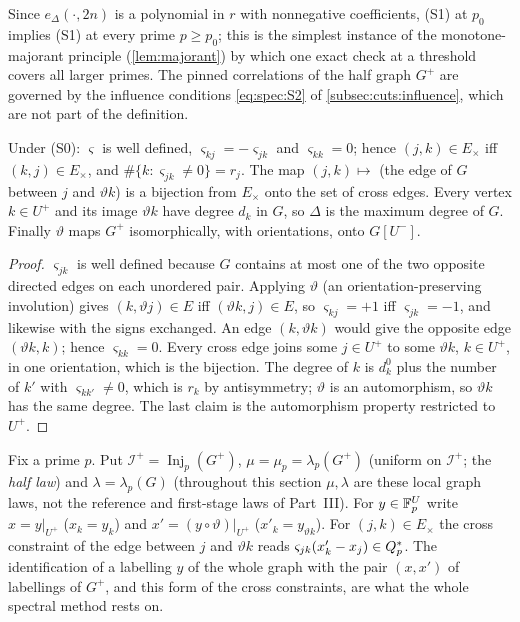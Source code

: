 Since $e_\Delta(\cdot,2n)$ is a polynomial in $r$ with nonnegative
coefficients, (S1) at $p_0$ implies (S1) at every prime $p\ge p_0$; this is the
simplest instance of the monotone-majorant principle (\cref{lem:majorant}) by
which one exact check at a threshold covers all larger primes. The pinned
correlations of the half graph $G^+$ are governed by the influence conditions
\eqref{eq:spec:S2} of \cref{subsec:cuts:influence}, which are not part of the
definition.

\begin{lemma}\label{lem:spec:elementary}
Under \textup{(S0)}: $\varsigma$ is well defined, $\varsigma_{kj}=-\varsigma_{jk}$
and $\varsigma_{kk}=0$; hence $(j,k)\in E_\times$ iff $(k,j)\in E_\times$, and
$\#\{k:\varsigma_{jk}\ne0\}=r_j$. The map $(j,k)\mapsto$ (the edge of $G$
between $j$ and $\vartheta k$) is a bijection from $E_\times$ onto the set of
cross edges. Every vertex $k\in U^+$ and its image $\vartheta k$ have degree
$d_k$ in $G$, so $\Delta$ is the maximum degree of $G$. Finally $\vartheta$
maps $G^+$ isomorphically, with orientations, onto $G[U^-]$.
\end{lemma}

\begin{proof}
$\varsigma_{jk}$ is well defined because $G$ contains at most one
of the two opposite directed edges on each unordered pair.
Applying
$\vartheta$ (an orientation-preserving involution) gives $(k,\vartheta j)\in E$
iff $(\vartheta k,j)\in E$, so $\varsigma_{kj}=+1$ iff $\varsigma_{jk}=-1$, and
likewise with the signs exchanged. An edge $(k,\vartheta k)$ would give the
opposite edge $(\vartheta k,k)$; hence $\varsigma_{kk}=0$. Every cross edge
joins some $j\in U^+$ to some $\vartheta k$, $k\in U^+$, in one orientation,
which is the bijection. The degree of $k$ is $d^0_k$ plus the number of $k'$
with $\varsigma_{kk'}\ne0$, which is $r_k$ by antisymmetry; $\vartheta$ is an
automorphism, so $\vartheta k$ has the same degree. The last claim is the
automorphism property restricted to $U^+$.
\end{proof}

Fix a prime $p$. Put $\mathcal I^+=\operatorname{Inj}_p(G^+)$,
$\mu=\mu_p=\lambda_p(G^+)$ (uniform on $\mathcal I^+$; the
\emph{half law}) and $\lambda=\lambda_p(G)$ (throughout this
section $\mu,\lambda$ are these local graph laws, not the
reference and first-stage laws of Part~III). For $y\in\mathbb F_p^U$ write $x=y|_{U^+}$ ($x_k=y_k$) and
$x'=(y\circ\vartheta)|_{U^+}$ ($x'_k=y_{\vartheta k}$). For $(j,k)\in E_\times$
the cross constraint of the edge between $j$ and $\vartheta k$ reads
$\varsigma_{jk}(x'_k-x_j)\in Q_{p}^{*}$. The identification of a labelling $y$ of the
whole graph with the pair $(x,x')$ of labellings of $G^+$, and this form of the
cross constraints, are what the whole spectral method rests on.

